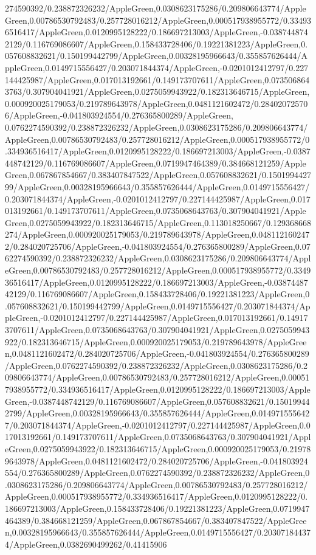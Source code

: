 {\begin{tikzternal}
{274590392/0.238872326232/AppleGreen,0.0308623175286/0.209806643774/AppleGreen,0.00786530792483/0.257728016212/AppleGreen,0.000517938955772/0.334936516417/AppleGreen,0.0120995128222/0.186697213003/AppleGreen,-0.0387448742129/0.116769086607/AppleGreen,0.158433728406/0.19221381223/AppleGreen,0.057608832621/0.150199442799/AppleGreen,0.00328195966643/0.355857626444/AppleGreen,0.0149715556427/0.203071844374/AppleGreen,-0.0201012412797/0.227144425987/AppleGreen,0.017013192661/0.149173707611/AppleGreen,0.0735068643763/0.307904041921/AppleGreen,0.0275059943922/0.182313646715/AppleGreen,0.000920025179053/0.219789643978/AppleGreen,0.0481121602472/0.284020725706/AppleGreen,-0.041803924554/0.276365800289/AppleGreen,
0.0762274590392/0.238872326232/AppleGreen,0.0308623175286/0.209806643774/AppleGreen,0.00786530792483/0.257728016212/AppleGreen,0.000517938955772/0.334936516417/AppleGreen,0.0120995128222/0.186697213003/AppleGreen,-0.0387448742129/0.116769086607/AppleGreen,0.0719947464389/0.384668121259/AppleGreen,0.067867854667/0.383407847522/AppleGreen,0.057608832621/0.150199442799/AppleGreen,0.00328195966643/0.355857626444/AppleGreen,0.0149715556427/0.203071844374/AppleGreen,-0.0201012412797/0.227144425987/AppleGreen,0.017013192661/0.149173707611/AppleGreen,0.0735068643763/0.307904041921/AppleGreen,0.0275059943922/0.182313646715/AppleGreen,0.113018250667/0.129368668274/AppleGreen,0.000920025179053/0.219789643978/AppleGreen,0.0481121602472/0.284020725706/AppleGreen,-0.041803924554/0.276365800289/AppleGreen,0.0762274590392/0.238872326232/AppleGreen,0.0308623175286/0.209806643774/AppleGreen,0.00786530792483/0.257728016212/AppleGreen,0.000517938955772/0.334936516417/AppleGreen,0.0120995128222/0.186697213003/AppleGreen,-0.0387448742129/0.116769086607/AppleGreen,0.158433728406/0.19221381223/AppleGreen,0.057608832621/0.150199442799/AppleGreen,0.0149715556427/0.203071844374/AppleGreen,-0.0201012412797/0.227144425987/AppleGreen,0.017013192661/0.149173707611/AppleGreen,0.0735068643763/0.307904041921/AppleGreen,0.0275059943922/0.182313646715/AppleGreen,0.000920025179053/0.219789643978/AppleGreen,0.0481121602472/0.284020725706/AppleGreen,-0.041803924554/0.276365800289/AppleGreen,0.0762274590392/0.238872326232/AppleGreen,0.0308623175286/0.209806643774/AppleGreen,0.00786530792483/0.257728016212/AppleGreen,0.000517938955772/0.334936516417/AppleGreen,0.0120995128222/0.186697213003/AppleGreen,-0.0387448742129/0.116769086607/AppleGreen,0.057608832621/0.150199442799/AppleGreen,0.00328195966643/0.355857626444/AppleGreen,0.0149715556427/0.203071844374/AppleGreen,-0.0201012412797/0.227144425987/AppleGreen,0.017013192661/0.149173707611/AppleGreen,0.0735068643763/0.307904041921/AppleGreen,0.0275059943922/0.182313646715/AppleGreen,0.000920025179053/0.219789643978/AppleGreen,0.0481121602472/0.284020725706/AppleGreen,-0.041803924554/0.276365800289/AppleGreen,0.0762274590392/0.238872326232/AppleGreen,0.0308623175286/0.209806643774/AppleGreen,0.00786530792483/0.257728016212/AppleGreen,0.000517938955772/0.334936516417/AppleGreen,0.0120995128222/0.186697213003/AppleGreen,0.158433728406/0.19221381223/AppleGreen,0.0719947464389/0.384668121259/AppleGreen,0.067867854667/0.383407847522/AppleGreen,0.00328195966643/0.355857626444/AppleGreen,0.0149715556427/0.203071844374/AppleGreen,0.0382690499262/0.41415906}
\end{tikzternal}}
